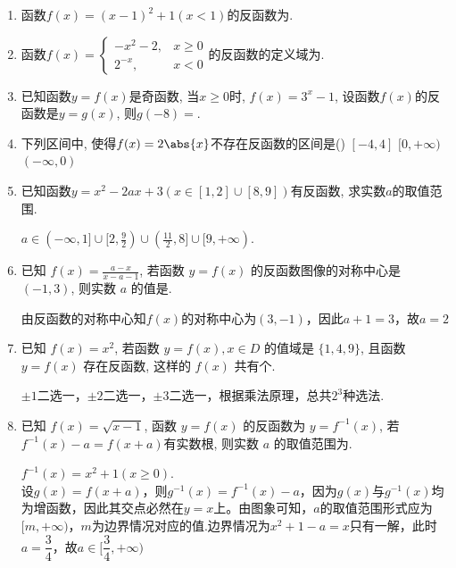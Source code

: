 \begin{enumerate}
\item 函数$f(x)=(x-1)^2+1(x<1)$的反函数为. 

\item 函数$f(x)=\begin{cases}
-x^2-2, & x\geq 0\\
2^{-x}, & x<0
\end{cases}$的反函数的定义域为\blkda[4]{$(-\infty,-2]\cup(1,+\infty)$}. 

\item 已知函数$y=f(x)$是奇函数, 当$x\geq 0$时, $f(x)=3^x-1$, 设函数$f(x)$的反函数是$y=g(x)$, 则$g(-8)=$. 


\item 下列区间中, 使得$f(x)=2\abs{x}$不存在反函数的区间是\dotfill()
\xx{$[2,4]$}
{$[-4,4]$}
{$[0,+\infty)$}
{$(-\infty,0)$}

\item 已知函数$y=x^2-2ax+3(x\in[1,2]\cup[8,9])$有反函数, 求实数$a$的取值范围. 
\begin{jieda}
$a\in(-\infty,1]\cup[2,\frac{9}{2})\cup(\frac{11}{2},8]\cup[9,+\infty)$. 
\end{jieda}


\item 已知 $f(x)=\frac{a-x}{x-a-1}$, 若函数 $y=f(x)$ 的反函数图像的对称中心是 $(-1,3)$, 则实数 $a$ 的值是.
\begin{jieda}
    由反函数的对称中心知$f(x)$的对称中心为$(3, -1)$，因此$a+1 = 3$，故$a = 2$
\end{jieda}


\item 已知 $f(x)=x^2$, 若函数 $y=f(x), x \in D$ 的值域是 $\{1,4,9\}$, 且函数 $y=f(x)$ 存在反函数, 这样的 $f(x)$ 共有个.
\begin{jieda}
    $\pm 1$二选一，$\pm 2$二选一，$\pm 3$二选一，根据乘法原理，总共$2^3$种选法.
\end{jieda}

\item 已知 $f(x)=\sqrt{x-1}$, 函数 $y=f(x)$ 的反函数为 $y=f^{-1}(x)$, 若 $f^{-1}(x)-a=f(x+a)$有实数根, 则实数 $a$ 的取值范围为\blkda{$[\dfrac{3}{4}, +\infty)$}.
\begin{jieda}
    $f^{-1}(x) = x^2 + 1 (x \geq 0)$. \\
    设$g(x) = f(x+a)$，则$g^{-1}(x) = f^{-1}(x)-a$，因为$g(x)$与$g^{-1}(x)$均为增函数，因此其交点必然在$y = x$上。由图象可知，$a$的取值范围形式应为$[m, +\infty)$，$m$为边界情况对应的值.边界情况为$x^2 + 1 - a = x$只有一解，此时$a = \dfrac{3}{4}$，故$a \in [\dfrac{3}{4}, +\infty)$
\end{jieda}



\end{enumerate}
